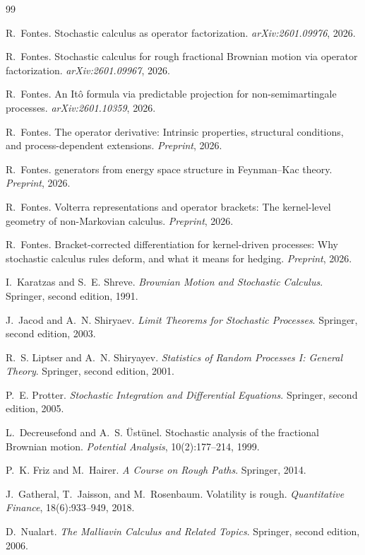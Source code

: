 \documentclass[11pt]{article}
\theoremstyle{plain}
\theoremstyle{definition}
\theoremstyle{remark}
\begin{document}
\begin{thebibliography}{99}

R.~Fontes.
\newblock Stochastic calculus as operator factorization.
\newblock \emph{arXiv:2601.09976}, 2026.

R.~Fontes.
\newblock Stochastic calculus for rough fractional {B}rownian motion via
operator factorization.
\newblock \emph{arXiv:2601.09967}, 2026.

R.~Fontes.
\newblock An {I}t\^o formula via predictable projection for non-semimartingale
processes.
\newblock \emph{arXiv:2601.10359}, 2026.

R.~Fontes.
\newblock The operator derivative: Intrinsic properties, structural conditions,
and process-dependent extensions.
\newblock \emph{Preprint}, 2026.

R.~Fontes.
 generators from energy space structure in {F}eynman--{K}ac theory.
\newblock \emph{Preprint}, 2026.

R.~Fontes.
\newblock Volterra representations and operator brackets: The kernel-level
geometry of non-{M}arkovian calculus.
\newblock \emph{Preprint}, 2026.

R.~Fontes.
\newblock Bracket-corrected differentiation for kernel-driven processes:
Why stochastic calculus rules deform, and what it means for hedging.
\newblock \emph{Preprint}, 2026.

I.~Karatzas and S.~E. Shreve.
\newblock \emph{Brownian Motion and Stochastic Calculus}.
\newblock Springer, second edition, 1991.

J.~Jacod and A.~N. Shiryaev.
\newblock \emph{Limit Theorems for Stochastic Processes}.
\newblock Springer, second edition, 2003.

R.~S. Liptser and A.~N. Shiryayev.
\newblock \emph{Statistics of Random Processes I: General Theory}.
\newblock Springer, second edition, 2001.

P.~E. Protter.
\newblock \emph{Stochastic Integration and Differential Equations}.
\newblock Springer, second edition, 2005.

L.~Decreusefond and A.~S. \"Ust\"unel.
\newblock Stochastic analysis of the fractional {B}rownian motion.
\newblock \emph{Potential Analysis}, 10(2):177--214, 1999.

P.~K. Friz and M.~Hairer.
\newblock \emph{A Course on Rough Paths}.
\newblock Springer, 2014.

J.~Gatheral, T.~Jaisson, and M.~Rosenbaum.
\newblock Volatility is rough.
\newblock \emph{Quantitative Finance}, 18(6):933--949, 2018.

D.~Nualart.
\newblock \emph{The {M}alliavin Calculus and Related Topics}.
\newblock Springer, second edition, 2006.

\end{thebibliography}
\end{document}

